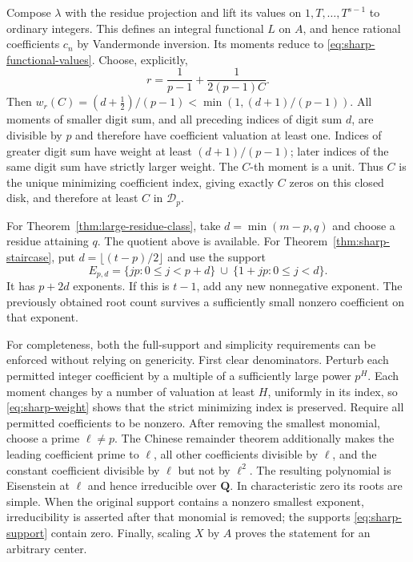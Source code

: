 Compose $\lambda$ with the residue projection and lift its values on
$1,T,\ldots,T^{s-1}$ to ordinary integers.  This defines an integral
functional $L$ on $A$, and hence rational coefficients $c_n$ by
Vandermonde inversion.  Its moments reduce to
\eqref{eq:sharp-functional-values}.  Choose, explicitly,
\[
 r=\frac1{p-1}+\frac1{2(p-1)C}.
\]
Then
$w_r(C)=(d+\tfrac12)/(p-1)<\min(1,(d+1)/(p-1))$.
All moments of smaller digit sum, and all preceding indices of digit
sum $d$, are divisible by $p$ and therefore have coefficient valuation
at least one.  Indices of greater digit sum have weight at least
$(d+1)/(p-1)$; later indices of the same digit sum have strictly
larger weight.  The $C$-th moment is a unit.  Thus $C$ is the unique
minimizing coefficient index, giving exactly $C$ zeros on this closed
disk, and therefore at least $C$ in $\mathcal D_p$.

For Theorem~\ref{thm:large-residue-class}, take
$d=\min(m-p,q)$ and choose a residue attaining $q$.  The quotient
above is available.  For Theorem~\ref{thm:sharp-staircase}, put
$d=\lfloor(t-p)/2\rfloor$ and use the support
\begin{equation}\label{eq:sharp-support}
 E_{p,d}=\{jp:0\le j<p+d\}\ \cup\
                   \{1+jp:0\le j<d\}.
\end{equation}
It has $p+2d$ exponents.  If this is $t-1$, add any new nonnegative
exponent.  The previously obtained root count survives a sufficiently
small nonzero coefficient on that exponent.

For completeness, both the full-support and simplicity requirements
can be enforced without relying on genericity.  First clear
denominators.  Perturb each permitted integer coefficient by a
multiple of a sufficiently large power $p^H$.  Each moment changes
by a number of valuation at least $H$, uniformly in its index, so
\eqref{eq:sharp-weight} shows that the strict minimizing index is
preserved.  Require all permitted coefficients to be nonzero.
After removing the smallest monomial, choose a prime $\ell\ne p$.
The Chinese remainder theorem additionally makes the leading
coefficient prime to $\ell$, all other coefficients divisible by
$\ell$, and the constant coefficient divisible by $\ell$ but not by
$\ell^2$.  The resulting polynomial is Eisenstein at $\ell$ and hence
irreducible over $\mathbf Q$.  In characteristic zero its roots are
simple.  When the original support contains a nonzero smallest
exponent, irreducibility is asserted after that monomial is removed;
the supports \eqref{eq:sharp-support} contain zero.  Finally, scaling
$X$ by $A$ proves the statement for an arbitrary center.

